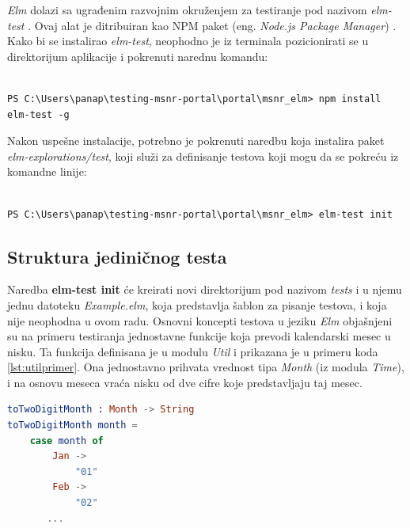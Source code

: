 \documentclass[12pt,oneside]{memoir}
\begin{document}
\par \emph{Elm} dolazi sa ugrađenim razvojnim okruženjem za testiranje pod nazivom \emph{elm-test} \cite{elm-test}. Ovaj alat je ditribuiran kao NPM paket (eng. \emph{Node.js Package Manager}) \cite{npm}. Kako bi se instalirao \emph{elm-test}, neophodno je iz terminala pozicionirati se u direktorijum aplikacije i pokrenuti narednu komandu: 

\begin{lstlisting}[style=DOS]

PS C:\Users\panap\testing-msnr-portal\portal\msnr_elm> npm install elm-test -g

\end{lstlisting}

\par Nakon uspešne instalacije, potrebno je pokrenuti naredbu koja instalira paket \emph{elm-explorations/test}, koji služi za definisanje testova koji mogu da se pokreću iz komandne linije:  

\begin{lstlisting}[style=DOS]

PS C:\Users\panap\testing-msnr-portal\portal\msnr_elm> elm-test init

\end{lstlisting}

\subsection{Struktura jediničnog testa}

\par Naredba \textbf{elm-test init} će kreirati novi direktorijum pod nazivom \emph{tests} i u njemu jednu datoteku \emph{Example.elm}, koja predstavlja šablon za pisanje testova, i koja nije neophodna u ovom radu. Osnovni koncepti testova u jeziku \emph{Elm} objašnjeni su na primeru testiranja jednostavne funkcije koja prevodi kalendarski mesec u nisku. Ta funkcija definisana je u modulu \emph{Util} i prikazana je u primeru koda \ref{lst:utilprimer}. Ona jednostavno prihvata vrednost tipa \emph{Month} (iz modula \emph{Time}), i na osnovu meseca vraća nisku od dve cifre koje predstavljaju taj mesec.

\begin{lstlisting}[language=elm, caption={Funkcija \emph{toTwoDigitMonth}},captionpos=b, label={lst:utilprimer}]
toTwoDigitMonth : Month -> String
toTwoDigitMonth month =
    case month of
        Jan ->
            "01"
        Feb ->
            "02"
       ...
\end{lstlisting}
\end{document}
